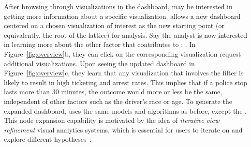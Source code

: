After browsing through visualizations in the dashboard,
 may be interested in getting more information
about a specific visualization.
\system allows  
a new dashboard centered on a chosen visualization
of interest as the new starting point
(or equivalently, the root of the lattice)
for analysis.
Say the analyst is now interested in learning more
about the other factor that contributes to :
.
In Figure~\ref{fig:overview}b, they
can click on the corresponding visualization
 request additional visualizations.
Upon seeing the updated dashboard in Figure~\ref{fig:overview}c,
they learn that any visualization
that involves the 
filter is likely to result in high ticketing and arrest rates.
This implies that if a police stop lasts more than 30 minutes,
the outcome would more or less be the same,
independent of other factors such as the driver's race or age. To generate the expanded dashboard, \system uses the same models and algorithms as before, except the .
This node expansion capability is motivated
by the idea of \textit{iterative view refinement}
 visual analytics systems,
which is essential for users to iterate on and
explore different hypotheses~\cite{Hoque2017,Wongsuphasawat2016}.
